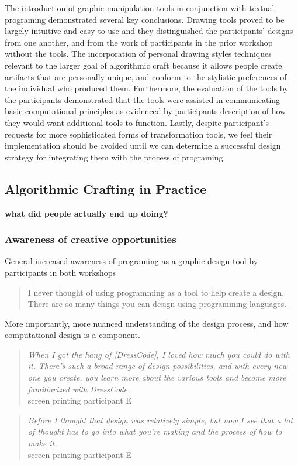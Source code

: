 \documentclass{sigchi}
\begin{document}
The introduction of graphic manipulation tools in conjunction with textual programing demonstrated several key conclusions. Drawing tools proved to be largely intuitive and easy to use and they distinguished the participants' designs from one another, and from the work of participants in the prior workshop without the tools. The incorporation of personal drawing styles techniques relevant to the larger goal of algorithmic craft because it allows people create artifacts that are personally unique, and conform to the stylistic preferences of the individual who produced them. Furthermore, the evaluation of the tools by the participants demonstrated that the tools were assisted in communicating basic computational principles as evidenced by participants description of how they would want additional tools to function. Lastly, despite participant's requests for more sophisticated forms of transformation tools, we feel their implementation should be avoided until we can determine a successful design strategy for integrating them with the process of programing. 

\subsection{Algorithmic Crafting in Practice}
\textbf{what did people actually end up doing?}
\subsubsection{Awareness of creative opportunities}
General increased awareness of programing as a graphic design tool by participants in both workshops
\begin{quotation}
	I never thought of using programming as a tool to help create a design. There are so many things you can design using programming languages.
\end{quotation}

More importantly, more nuanced understanding of the design process, and how computational design is a component.
\begin{quotation}
	\textit{When I got the hang of [DressCode], I loved how much you could do with it. There's such a broad range of design possibilities, and with every new one you create, you learn more about the various tools and become more familiarized with DressCode.}
	\\screen printing participant E
\end{quotation}

\begin{quotation}
	\textit{Before I thought that design was relatively simple, but now I see that a lot of thought has to go into what you're making and the process of how to make it.}
		\\screen printing participant E
	\end{quotation}
\end{document}
